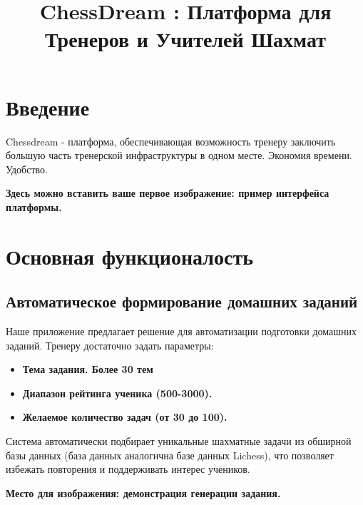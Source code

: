 \documentclass[a4paper,12pt]{article}
\title{ChessDream : Платформа для Тренеров и Учителей Шахмат}
\author{}
\date{}
\begin{document}
\maketitle
\tableofcontents
\newpage

\section{Введение}

Chessdream - платформа, обеспечивающая возможность тренеру заключить большую часть тренерской инфраструктуры в одном месте.
Экономия времени. Удобство.

\vspace{0.5cm}
\noindent
\textbf{Здесь можно вставить ваше первое изображение: пример интерфейса платформы.}
\begin{center}
\end{center}
\vspace{0.5cm}

\section{Основная функционалость}

\subsection{Автоматическое формирование домашних заданий}
Наше приложение предлагает решение для автоматизации подготовки домашних заданий. Тренеру достаточно задать параметры:
\begin{itemize}
    \item \textbf{Тема задания. Более 30 тем}
    \item \textbf{Диапазон рейтинга ученика (500-3000).}
    \item \textbf{Желаемое количество задач (от 30 до 100).}
\end{itemize}
Система автоматически подбирает уникальные шахматные задачи из обширной базы данных (база данных аналогична базе данных Lichess), что позволяет избежать повторения и поддерживать интерес учеников.

\vspace{0.5cm}
\noindent
\textbf{Место для изображения: демонстрация генерации задания.}
\begin{center}
\end{center}
\vspace{0.5cm}
\end{document}
